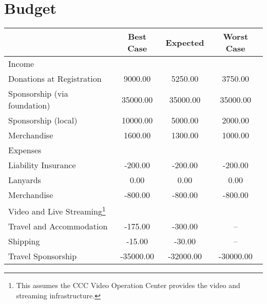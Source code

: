 
\section{Budget}

 
\begin{tabularx}{\linewidth}{XSSS}
   & {Best Case} & {Expected} & {Worst Case} \\
  \hline\hline
Income \hspace*{1em}  & {} & {} & {}\\
\hspace*{1em} Donations at Registration  & 9000.00 & 5250.00 & 3750.00\\
\hspace*{1em} Sponsorship (via foundation)  & 35000.00 & 35000.00 & 35000.00\\
\hspace*{1em} Sponsorship (local)  & 10000.00 & 5000.00 & 2000.00\\
\hspace*{1em} Merchandise  & 1600.00 & 1300.00 & 1000.00\\
Expenses \hspace*{1em}  & {} & {} & {}\\
\hspace*{1em} Liability Insurance  & -200.00 & -200.00 & -200.00\\
\hspace*{1em} Lanyards  & 0.00 & 0.00 & 0.00\\
\hspace*{1em} Merchandise  & -800.00 & -800.00 & -800.00\\
\hspace*{1em} Video and Live Streaming\footnote{This assumes the CCC Video Operation Center provides the video and streaming infrastructure.}  & {} & {} & {}\\
\hspace*{1em} \hspace*{1em} Travel and Accommodation & -175.00 & -300.00 & {–}\\
\hspace*{1em} \hspace*{1em} Shipping & -15.00 & -30.00 & {–}\\
\hspace*{1em} Travel Sponsorship  & -35000.00 & -32000.00 & -30000.00\\

\end{tabularx}
